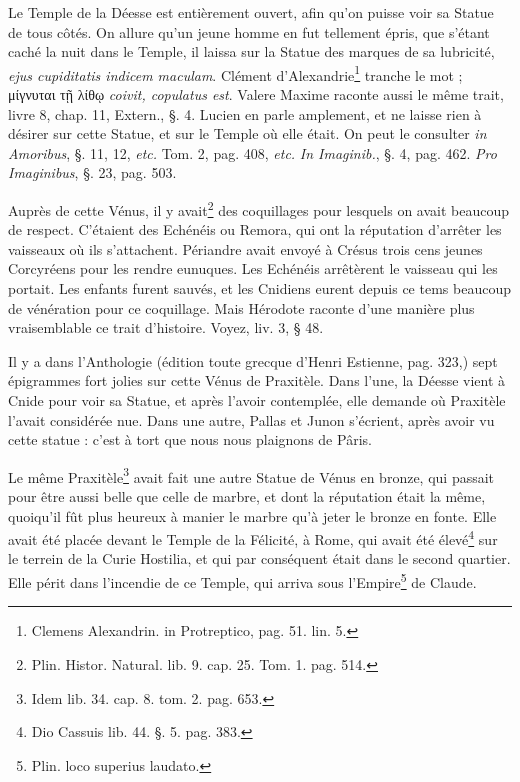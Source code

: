 \documentclass[a4paper, 18pt, oneside]{article}
\begin{document}
Le Temple de la Déesse est entièrement ouvert, afin qu'on puisse voir sa Statue de tous côtés. On allure qu'un jeune homme en fut tellement épris, que s'étant caché la nuit dans le Temple, il laissa sur la Statue des marques de sa lubricité, \emph{ejus cupiditatis indicem maculam}. Clément d'Alexandrie\footnote{Clemens Alexandrin. in Protreptico, pag. 51. lin. 5.} tranche le mot ; μίγνυται τῇ λίθῳ \emph{coivit, copulatus est}. Valere Maxime raconte aussi le même trait, livre 8, chap. 11, Extern., §. 4. Lucien en parle amplement, et ne laisse rien à désirer sur cette Statue, et sur le Temple où elle était. On peut le consulter \emph{in Amoribus}, §. 11, 12, \emph{etc.} Tom. 2, pag. 408, \emph{etc.} \emph{In Imaginib.}, §. 4, pag. 462. \emph{Pro Imaginibus}, §. 23, pag. 503.

Auprès de cette Vénus, il y avait\footnote{Plin. Histor. Natural. lib. 9. cap. 25. Tom. 1. pag. 514.} des coquillages pour lesquels on avait beaucoup de respect. C'étaient des Echénéis ou Remora, qui ont la réputation d'arrêter les vaisseaux où ils s'attachent. Périandre avait envoyé à Crésus trois cens jeunes Corcyréens pour les rendre eunuques. Les Echénéis arrêtèrent le vaisseau qui les portait. Les enfants furent sauvés, et les Cnidiens eurent depuis ce tems beaucoup de vénération pour ce coquillage. Mais Hérodote raconte d'une manière plus vraisemblable ce trait d'histoire. Voyez, liv. 3, § 48.

Il y a dans l'Anthologie (édition toute grecque d'Henri Estienne, pag. 323,) sept épigrammes fort jolies sur cette Vénus de Praxitèle. Dans l'une, la Déesse vient à Cnide pour voir sa Statue, et après l'avoir contemplée, elle demande où Praxitèle l'avait considérée nue. Dans une autre, Pallas et Junon s'écrient, après avoir vu cette statue : c'est à tort que nous nous plaignons de Pâris.

Le même Praxitèle\footnote{Idem lib. 34. cap. 8. tom. 2. pag. 653.} avait fait une autre Statue de Vénus en bronze, qui passait pour être aussi belle que celle de marbre, et dont la réputation était la même, quoiqu'il fût plus heureux à manier le marbre qu'à jeter le bronze en fonte. Elle avait été placée devant le Temple de la Félicité, à Rome, qui avait été élevé\footnote{Dio Cassuis lib. 44. §. 5. pag. 383.} sur le terrein de la Curie Hostilia, et qui par conséquent était dans le second quartier. Elle périt dans l'incendie de ce Temple, qui arriva sous l'Empire\footnote{Plin. loco superius laudato.} de Claude.
\end{document}
